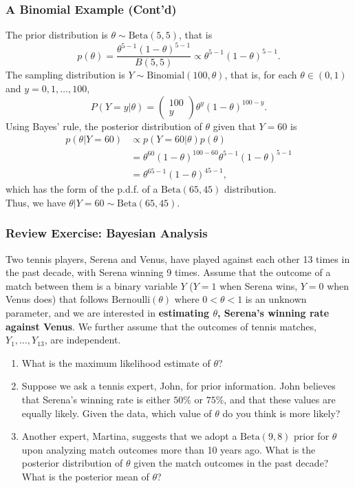 \documentclass{beamer}
\begin{document}
\begin{frame}
\frametitle{A Binomial Example (Cont'd)}
The prior distribution is $\theta \sim \text{Beta}(5,5)$, that is
$$
p(\theta) = \frac{\theta^{5-1}(1-\theta)^{5-1}}{B(5,5)}
\propto \theta^{5-1}(1-\theta)^{5-1}.
$$
The sampling distribution is $Y \sim \text{Binomial}(100,\theta)$, that is, for each $\theta \in (0,1)$ and $y=0,1,\ldots,100$,
$$
P(Y=y|\theta) = 
\begin{pmatrix}
100\\
y
\end{pmatrix}
\theta^{y}(1-\theta)^{100-y}.
$$
Using Bayes' rule, the posterior distribution of $\theta$ given that $Y=60$ is
$$
\begin{aligned}
p(\theta|Y=60) &\propto p(Y=60|\theta)p(\theta)\\
& = \theta^{60}(1-\theta)^{100-60} \theta^{5-1}(1-\theta)^{5-1}\\
&= \theta^{65-1}(1-\theta)^{45-1},
\end{aligned}
$$
which has the form of the p.d.f. of a $\text{Beta}(65,45)$ distribution.\\
Thus, we have $\theta|Y=60 \sim \text{Beta}(65,45)$.
\end{frame}

\begin{frame}
\frametitle{Review Exercise: Bayesian Analysis}
Two tennis players, Serena and Venus, have played against each other 13 times in the past decade, with Serena winning 9 times. Assume that the outcome of a match between them is a binary variable $Y$ ($Y=1$ when Serena wins, $Y=0$ when Venus does) that follows $\text{Bernoulli}(\theta)$ where $0 < \theta < 1$ is an unknown parameter, and we are interested in \textbf{estimating $\theta$, Serena's winning rate against Venus}. We further assume that the outcomes of tennis matches, $Y_1,\ldots,Y_{13}$, are independent.
\begin{enumerate}
\item What is the maximum likelihood estimate of $\theta$?
\item Suppose we ask a tennis expert, John, for prior information. John believes that Serena's winning rate is either $50\%$ or $75\%$, and that these values are equally likely. Given the data, which value of $\theta$ do you think is more likely?
\item Another expert, Martina, suggests that we adopt a $\text{Beta}(9,8)$ prior for $\theta$ %
upon analyzing match outcomes more than 10 years ago.
What is the posterior distribution of $\theta$ given the match outcomes in the past decade? What is the posterior mean of $\theta$?
\end{enumerate}
\end{frame}

\end{document}
